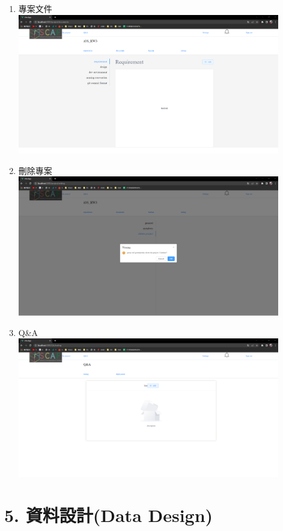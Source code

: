 \documentclass{report}
\begin{document}
\begin{enumerate}
	\item 專案文件 \\ \includegraphics[width=0.9\textwidth]{assets/UI/doc.png}
	\item 刪除專案 \\ \includegraphics[width=0.9\textwidth]{assets/UI/delete_project.png}
	\item Q\&A \\ \includegraphics[width=0.9\textwidth]{assets/UI/QA.png}
\end{enumerate}

\section*{5. 資料設計(Data Design)}
\end{document}
